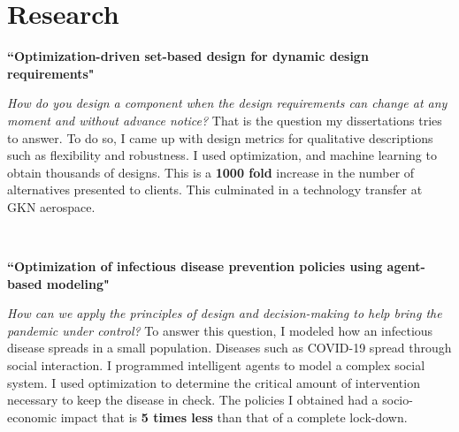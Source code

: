 \documentclass[10pt]{article} %
\begin{document}
\vspace{-\baselineskip} %

\section{Research}

{\raggedright\textbf{``Optimization-driven set-based design for dynamic design requirements"}}
\textit{\center How do you design a component when the design requirements can change at any moment and without advance notice?}
That is the question my dissertations tries to answer. To do so, I came up with design metrics for qualitative descriptions such as flexibility and robustness. I used optimization, and machine learning to obtain thousands of designs. This is a \textbf{1000 fold} increase in the number of alternatives presented to clients. This culminated in a technology transfer at GKN aerospace.

~~~~~

\medskip %

{\raggedright\textbf{``Optimization of infectious disease prevention policies using agent-based modeling"}}
\textit{\center How can we apply the principles of design and decision-making to help bring the pandemic under control?}
To answer this question, I modeled how an infectious disease spreads in a small population. Diseases such as COVID-19 spread through social interaction. I programmed intelligent agents to model a complex social system. I used optimization to determine the critical amount of intervention necessary to keep the disease in check. The policies I obtained had a socio-economic impact that is \textbf{5 times less} than that of a complete lock-down.

~~~~
\end{document}
